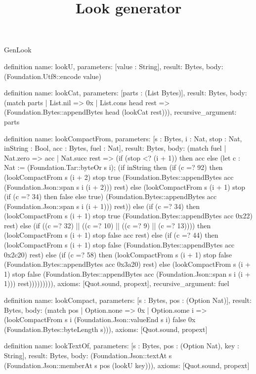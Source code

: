 \begin{lexlean}{GenLook}
\title{Look generator}
\begin{semanticmodule}
definition{
  name: lookU,
  parameters: [value : String],
  result: Bytes,
  body: (Foundation.Utf8::encode value)
}

definition{
  name: lookCat,
  parameters: [parts : (List Bytes)],
  result: Bytes,
  body: (match parts
    | List.nil => 0x
    | List.cons head rest => (Foundation.Bytes::appendBytes head (lookCat rest))),
  recursive_argument: parts
}

definition{
  name: lookCompactFrom,
  parameters: [s : Bytes, i : Nat, stop : Nat, inString : Bool, acc : Bytes, fuel : Nat],
  result: Bytes,
  body: (match fuel
    | Nat.zero => acc
    | Nat.succ rest => (if (stop <? (i + 1)) then acc else (let c : Nat := (Foundation.Tar::byteOr s i); (if inString then (if (c =? 92) then (lookCompactFrom s (i + 2) stop true (Foundation.Bytes::appendBytes acc (Foundation.Json::span s i (i + 2))) rest) else (lookCompactFrom s (i + 1) stop (if (c =? 34) then false else true) (Foundation.Bytes::appendBytes acc (Foundation.Json::span s i (i + 1))) rest)) else (if (c =? 34) then (lookCompactFrom s (i + 1) stop true (Foundation.Bytes::appendBytes acc 0x22) rest) else (if ((c =? 32) || ((c =? 10) || ((c =? 9) || (c =? 13)))) then (lookCompactFrom s (i + 1) stop false acc rest) else (if (c =? 44) then (lookCompactFrom s (i + 1) stop false (Foundation.Bytes::appendBytes acc 0x2c20) rest) else (if (c =? 58) then (lookCompactFrom s (i + 1) stop false (Foundation.Bytes::appendBytes acc 0x3a20) rest) else (lookCompactFrom s (i + 1) stop false (Foundation.Bytes::appendBytes acc (Foundation.Json::span s i (i + 1))) rest))))))))),
  axioms: [Quot.sound, propext],
  recursive_argument: fuel
}

definition{
  name: lookCompact,
  parameters: [s : Bytes, pos : (Option Nat)],
  result: Bytes,
  body: (match pos
    | Option.none => 0x
    | Option.some i => (lookCompactFrom s i (Foundation.Json::valueEnd s i) false 0x (Foundation.Bytes::byteLength s))),
  axioms: [Quot.sound, propext]
}

definition{
  name: lookTextOf,
  parameters: [s : Bytes, pos : (Option Nat), key : String],
  result: Bytes,
  body: (Foundation.Json::textAt s (Foundation.Json::memberAt s pos (lookU key))),
  axioms: [Quot.sound, propext]
}


\end{semanticmodule}
\end{lexlean}
